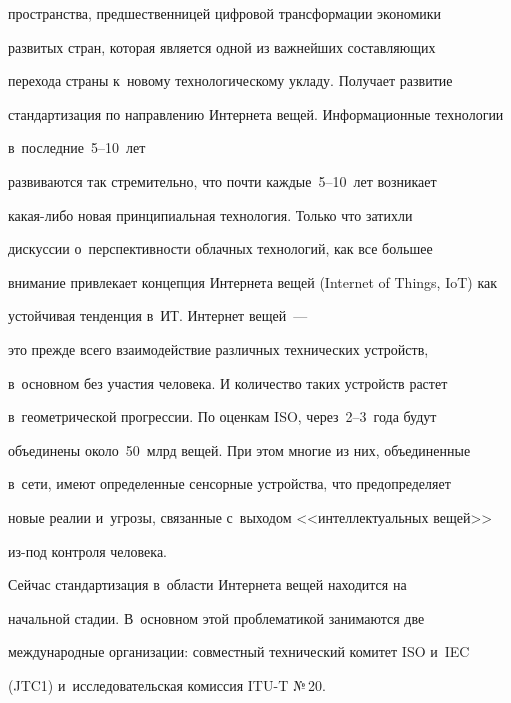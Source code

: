 пространства, предшественницей цифровой трансформации экономики 


развитых стран, которая является одной из важнейших составляющих 


перехода страны к~новому технологическому укладу. Получает развитие 


стандартизация по направлению Интернета вещей. Информационные технологии 


в~последние~5--10~лет 


развиваются так стремительно, что почти каждые~5--10~лет возникает  


ка\-кая-ли\-бо новая принципиальная технология. Только что затихли 


дискуссии о~перспективности облачных технологий, как все большее 


внимание привлекает концепция Интернета вещей (Internet of Things, IoT) как 


устойчивая тенденция в~ИТ. Интернет вещей~--- 


это прежде всего взаимодействие различных технических устройств, 


в~основном без участия человека. И количество таких устройств растет 


в~геометрической прогрессии. По оценкам ISO, через~2--3~года будут 


объединены около~50~млрд вещей. При этом многие из них, объединенные 


в~сети, имеют определенные сенсорные устройства, что предопределяет 


новые реалии и~угрозы, связанные с~выходом <<интеллектуальных вещей>> 


из-под контроля человека. 


      


      Сейчас стандартизация в~области Интернета вещей находится на 


начальной стадии. В~основном этой проблематикой занимаются две 


международные организации: совместный технический комитет ISO и~IEC 


(JTC1) и~исследовательская комиссия ITU-T №\,20.





